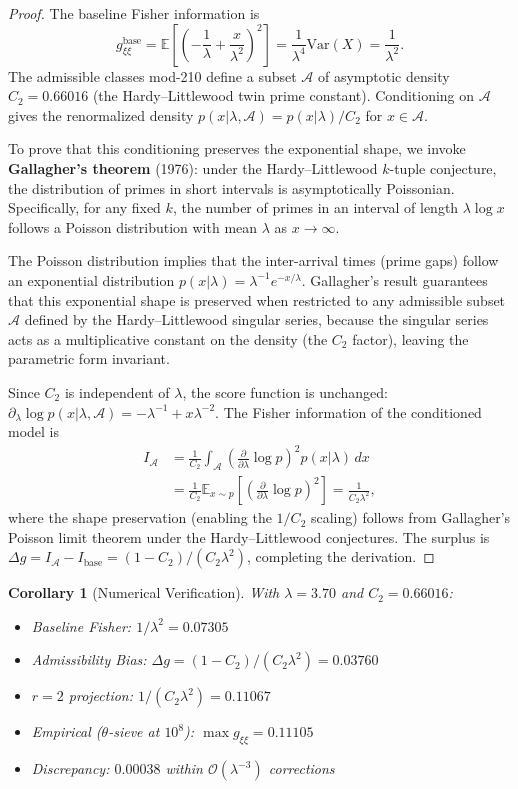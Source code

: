 \documentclass[12pt]{article}
\newtheorem{corollary}[theorem]{Corollary}
\begin{document}
\begin{proof}
The baseline Fisher information is
\[
  g_{\xi\xi}^{\text{base}} = \mathbb{E}\!\left[\left(-\frac{1}{\lambda} + \frac{x}{\lambda^2}\right)^2\right]
  = \frac{1}{\lambda^4}\text{Var}(X) = \frac{1}{\lambda^2}.
\]
The admissible classes mod-210 define a subset $\mathcal{A}$ of asymptotic density
$C_2 = 0.66016$ (the Hardy--Littlewood twin prime constant). Conditioning on
$\mathcal{A}$ gives the renormalized density
$p(x|\lambda,\mathcal{A}) = p(x|\lambda)/C_2$ for $x \in \mathcal{A}$.

To prove that this conditioning preserves the exponential shape, we invoke
\textbf{Gallagher's theorem} (1976): under the Hardy--Littlewood $k$-tuple
conjecture, the distribution of primes in short intervals is asymptotically
Poissonian. Specifically, for any fixed $k$, the number of primes in an interval
of length $\lambda \log x$ follows a Poisson distribution with mean $\lambda$ as
$x \to \infty$.

The Poisson distribution implies that the inter-arrival times (prime gaps)
follow an exponential distribution $p(x|\lambda) = \lambda^{-1} e^{-x/\lambda}$.
Gallagher's result guarantees that this exponential shape is preserved when
restricted to any admissible subset $\mathcal{A}$ defined by the Hardy--Littlewood
singular series, because the singular series acts as a multiplicative constant
on the density (the $C_2$ factor), leaving the parametric form invariant.

Since $C_2$ is independent of $\lambda$, the score function is unchanged:
$\partial_\lambda \log p(x|\lambda,\mathcal{A}) = -\lambda^{-1} + x\lambda^{-2}$.
The Fisher information of the conditioned model is
\begin{align*}
  I_{\mathcal{A}} &= \frac{1}{C_2} \int_{\mathcal{A}}
    \left(\frac{\partial}{\partial\lambda}\log p\right)^2 p(x|\lambda)\,dx \\
  &= \frac{1}{C_2} \mathbb{E}_{x \sim p}\!\left[\left(\frac{\partial}{\partial\lambda}
    \log p\right)^2\right] = \frac{1}{C_2\lambda^2},
\end{align*}
where the shape preservation (enabling the $1/C_2$ scaling) follows from
Gallagher's Poisson limit theorem under the Hardy--Littlewood conjectures.
The surplus is $\Delta g = I_{\mathcal{A}} - I_{\text{base}} =
(1-C_2)/(C_2\lambda^2)$, completing the derivation.
\end{proof}

\begin{corollary}[Numerical Verification]
With $\lambda = 3.70$ and $C_2 = 0.66016$:
\begin{itemize}
  \item Baseline Fisher: $1/\lambda^2 = 0.07305$
  \item Admissibility Bias: $\Delta g = (1-C_2)/(C_2\lambda^2) = 0.03760$
  \item $r=2$ projection: $1/(C_2\lambda^2) = 0.11067$
  \item Empirical ($\theta$-sieve at $10^8$): $\max g_{\xi\xi} = 0.11105$
  \item Discrepancy: $0.00038$ within $\mathcal{O}(\lambda^{-3})$ corrections
\end{itemize}
\end{corollary}
\end{document}
